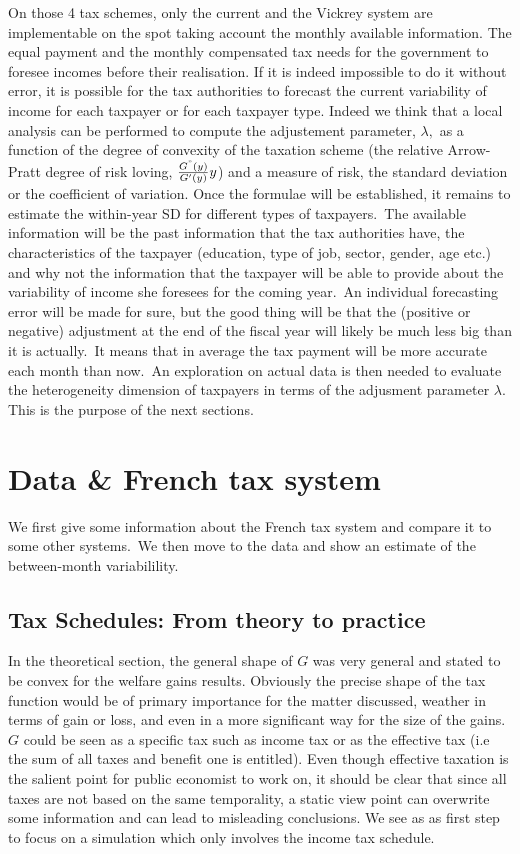 On those 4 tax schemes, only the current and the Vickrey system are
implementable on the spot taking account the monthly available information.
The equal payment and the monthly compensated tax needs for the government to
foresee incomes before their realisation. If it is indeed impossible to do it
without error, it is possible for the tax authorities to forecast the current
variability of income for each taxpayer or for each taxpayer type. Indeed we
think that a local analysis can be performed to compute the adjustement
parameter, $\lambda,$ as a function of the degree of convexity of the taxation
scheme (the relative Arrow-Pratt degree of risk loving, $\frac{G^{"}%
(y)}{G^{\prime}(y)}y$) and a measure of risk, the standard deviation or the
coefficient of variation. Once the formulae will be established, it remains to
estimate the within-year SD for different types of taxpayers.\ The available
information will be the past information that the tax authorities have, the
characteristics of the taxpayer (education, type of job, sector, gender, age
etc.) and why not the information that the taxpayer will be able to provide
about the variability of income she foresees for the coming year.\ An
individual forecasting error will be made for sure, but the good thing will be
that the (positive or negative) adjustment at the end of the fiscal year will
likely be much less big than it is actually.\ It means that in average the tax
payment will be more accurate each month than now.\ An exploration on actual
data is then needed to evaluate the heterogeneity dimension of taxpayers in
terms of the adjusment parameter $\lambda.$ This is the purpose of the next sections.

\section{Data \& French tax system}

We first give some information about the French tax system and compare it to
some other systems.\ We then move to the data and show an estimate of the
between-month variabilility.

\subsection{Tax Schedules: From theory to practice}

In the theoretical section, the general shape of $G$ was very general and
stated to be convex for the welfare gains results. Obviously the precise shape
of the tax function would be of primary importance for the matter discussed,
weather in terms of gain or loss, and even in a more significant way for the
size of the gains. $G$ could be seen as a specific tax such as income tax or
as the effective tax (i.e the sum of all taxes and benefit one is entitled).
Even though effective taxation is the salient point for public economist to
work on, it should be clear that since all taxes are not based on the same
temporality, a static view point can overwrite some information and can lead
to misleading conclusions. We see as as first step to focus on a simulation
which only involves the income tax schedule.\ 

